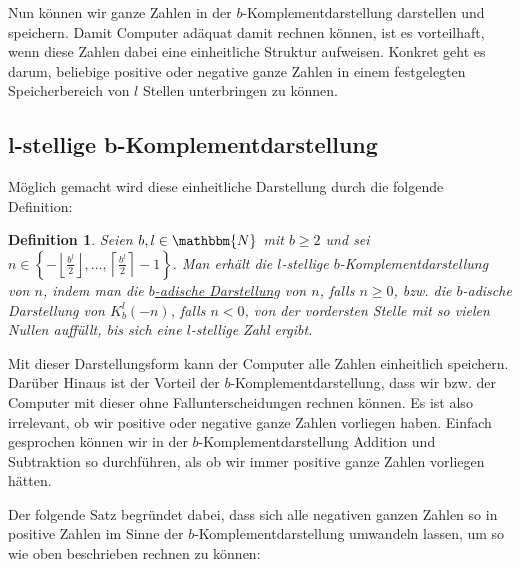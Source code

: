 \documentclass{article}
\newcommand{\N}{\mathbbm{N}} %
\newtheorem{definition}[satz]{Definition}
\begin{document}
  Nun können wir ganze Zahlen in der $b$-Komplementdarstellung darstellen und speichern.
  Damit Computer adäquat damit rechnen können, ist es vorteilhaft, wenn diese Zahlen dabei eine einheitliche Struktur aufweisen.
  Konkret geht es darum, beliebige positive oder negative ganze Zahlen in einem festgelegten Speicherbereich von $l$ Stellen unterbringen zu können.

\subsection{l-stellige b-Komplementdarstellung}
  Möglich gemacht wird diese einheitliche Darstellung durch die folgende Definition:

  \begin{definition} \label{def:l-stellige_b-Komplementdarstellung}
    Seien $b,l \in \N$ mit $b \geq 2$ und sei $n \in \left\{- \left\lfloor \displaystyle\frac{b^l}{2} \right\rfloor, \dots, \left\lceil \displaystyle\frac{b^l}{2} \right\rceil -1 \right\} .$
    Man erhält die $l$-stellige $b$-Komplementdarstellung von $n$, indem man die \hyperref[satz:b-adische_Darstellung]{$b$-adische Darstellung} von $n$, falls $n \geq 0$,
    bzw. die $b$-adische Darstellung von $K_b^l(-n)$, falls $n < 0$, von der vordersten Stelle mit so vielen Nullen auffüllt, bis sich eine $l$-stellige Zahl ergibt.
  \end{definition}

  Mit dieser Darstellungsform kann der Computer alle Zahlen einheitlich speichern.
  Darüber Hinaus ist der Vorteil der $b$-Komplementdarstellung, dass wir bzw. der Computer mit dieser ohne Fallunterscheidungen rechnen können.
  Es ist also irrelevant, ob wir positive oder negative ganze Zahlen vorliegen haben.
  Einfach gesprochen können wir in der $b$-Komplementdarstellung Addition und Subtraktion so durchführen, als ob wir immer positive ganze Zahlen vorliegen hätten.

  Der folgende Satz begründet dabei, dass sich alle negativen ganzen Zahlen so in positive Zahlen im Sinne der $b$-Komplementdarstellung umwandeln lassen, um so wie oben beschrieben rechnen zu können:
\end{document}
